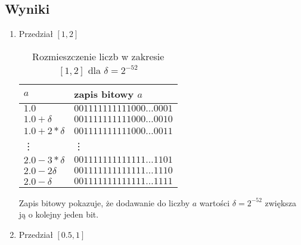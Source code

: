 \documentclass{classrep}
\begin{document}
	\subsection{Wyniki}
		\begin{enumerate}
			\item Przedział $[1,2]$
			
			\begin{table}[!h]
        		\centering
            	\begin{tabular}{ll} \toprule
                	$a$ & {zapis bitowy $a$} \\ \midrule
                	$1.0$ & $001111111111000\dots0001$ \\ 
 					$1.0+\delta$ & $001111111111000\dots0010$ \\
 					$1.0+2*\delta$ & $001111111111000\dots0011$ \\
 					\vdots & \vdots \\
 					$2.0-3*\delta$ & $001111111111111\dots1101$ \\
 					$2.0-2\delta$ & $001111111111111\dots1110$ \\
 					$2.0-\delta$ & $001111111111111\dots1111$ \\\bottomrule
            	\end{tabular}
            	\caption{Rozmieszczenie liczb w zakresie $[1,2]$ dla $\delta = 2^{-52}$}
				\label{table:5}
   			\end{table}
   			Zapis bitowy pokazuje, że dodawanie do liczby $a$ wartości $\delta = 2^{-52}$ zwiększa ją o 
			kolejny jeden bit. 
			\newline
			
			\item Przedział $[0.5,1]$
			

\end{enumerate}
\end{document}
